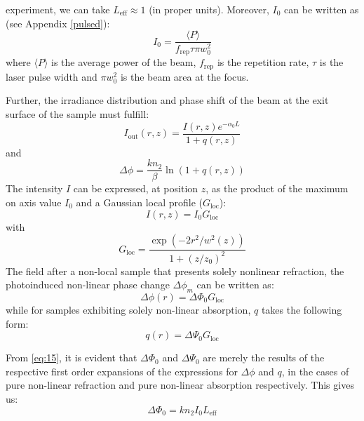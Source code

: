 \documentclass[%
 reprint,
 amsmath,amssymb,
 aps,
]{revtex4-2}
\begin{document}
		experiment, we can take $ L_{\mathrm{eff}} \approx 1 $ (in proper units). Moreover, $ I_{0} $ can be
		written as (see Appendix \ref{pulsed}):
		\begin{equation}\label{key}
			I_0 = \dfrac{\langle P \rangle}{f_{\mathrm{rep}} \tau \pi w_0^2}
		\end{equation}
		where $ \langle P \rangle $ is the average power of the beam, $ f_{\mathrm{rep}} $ is the repetition rate, $ \tau $ is the laser pulse width and $ \pi w_0^2 $ is the beam area at the focus.
		\par 
		Further, the irradiance distribution and phase shift of the beam at the exit surface of the sample must fulfill:
		\begin{equation}\label{key}
			I_{\mathrm{out}} (r,z) = \dfrac{I(r,z) e^{-\alpha_0L}}{1+q(r,z)}
		\end{equation}
		and
		\begin{equation}\label{eq:15}
			\Delta \phi = \dfrac{kn_2}{\beta} \ln (1+q(r,z))
		\end{equation}
		The intensity $ I $ can be expressed, at position $ z $, as the product of the maximum on axis value $ I_{0} $ and a Gaussian local profile ($ G_{\mathrm{loc}} $):
		\begin{equation}\label{key}
			I(r,z) = I_0 G_{\mathrm{loc}}
		\end{equation}
		with
		\begin{equation}\label{key}
			G_{\mathrm{loc}} = \dfrac{\exp(-2r^2/w^2(z))}{1+(z/z_0)^2}
		\end{equation}
		The field after a non-local sample that presents solely nonlinear refraction, the photoinduced non-linear phase change $ \Delta \phi_m $ can be written as:
		\begin{equation}\label{eq:18}
			\Delta \phi (r) = \Delta \Phi_0 G_{\mathrm{loc}}
		\end{equation}
		while for samples exhibiting solely non-linear absorption, $ q $ takes the following form:
		\begin{equation}\label{eq:19}
			q(r) = \Delta \Psi_0 G_{\mathrm{loc}}
		\end{equation}
		\par 
		From \eqref{eq:15}, it is evident that $ \Delta \Phi_0 $ and $ \Delta \Psi_0 $ are merely the results of the respective first order
		expansions of the expressions for $ \Delta \phi $  and $ q $, in the cases of pure
		non-linear refraction and pure non-linear absorption respectively. This gives us:
		\begin{equation}\label{key}
			 \Delta \Phi_0 = kn_2 I_0 L_{\mathrm{eff}}
		\end{equation}
\end{document}
